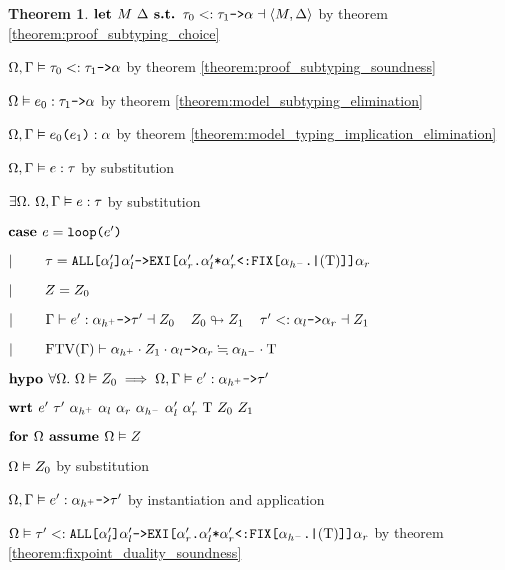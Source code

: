 \documentclass[acmsmall]{acmart}
\theoremstyle{definition}
\newtheorem{theorem}{Theorem}[section]
\begin{document}
\begin{theorem}
    \item \Z\Z $
      \B{let } M\ \Delta
      \B{ s.t. }
      \tau_0 \subtypes \code{$\tau_1$->$\alpha$} \given \left<M, \Delta \right>
    $ by theorem \ref{theorem:proof_subtyping_choice} 
    \item \Z\Z $
      \Omega, \Gamma \vDash \tau_0 <: \texttt{$\tau_1$->$\alpha$} 
    $ by theorem \ref{theorem:proof_subtyping_soundness} 
    \item \Z\Z $
      \Omega \vDash e_0 : \texttt{$\tau_1$->$\alpha$} 
    $ by theorem \ref{theorem:model_subtyping_elimination} 
    \item \Z\Z $
      \Omega, \Gamma \vDash \texttt{$e_0$($e_1$)} : \alpha
    $ by theorem \ref{theorem:model_typing_implication_elimination} 
    \item \Z\Z $
      \Omega, \Gamma \vDash e : \tau
    $ by substitution 
    \item \Z\Z $
      \exists \Omega .\ \Omega, \Gamma \vDash e : \tau
    $ by substitution 

  \item \Z $\textbf{case } 
    e = \texttt{loop($e'$)} 
  $ 
  \item \Z $|\ \ \ \ \ \ \   
    \tau = \texttt{ALL[$\alpha_l'$]$\alpha_l'$->EXI[$\alpha_r'$.$\alpha_l'$*$\alpha_r'$<:FIX[$\alpha_{h^-}$.|$(\mathrm{T})$]]$\alpha_r$} 
  $
  \item \Z $|\ \ \ \ \ \ \  
    Z = Z_0 
  $
  \item \Z $|\ \ \ \ \ \ \   
    \Gamma \vdash e' : \texttt{$\alpha_{h^+}$->$\tau'$} \dashv Z_0
    \hspace{4mm}
    Z_0 \looparrowright Z_1
    \hspace{4mm}
    \tau' <: \texttt{$\alpha_l$->$\alpha_r$} \dashv Z_1
  $ 
  \item \Z $|\ \ \ \ \ \ \   
    \text{FTV}(\Gamma) \vdash \alpha_{h^+} \cdot Z_1 \cdot \texttt{$\alpha_l$->$\alpha_r$} \fallingdotseq \alpha_{h^-} \cdot \mathrm{T}
  $
  \item \Z $\textbf{hypo } 
    \forall \Omega .\ \Omega \vDash Z_0 \implies
    \Omega, \Gamma \vDash e' : \texttt{$\alpha_{h^+}$->$\tau'$}
  $ 
  \item \Z $\B{wrt } e'\ \tau'\ \alpha_{h^+}\ \alpha_l\ \alpha_r\ \alpha_{h^-}\ \alpha_l'\ \alpha_r'\ \Tau\ Z_0\ Z_1 $ 
    \item \Z\Z $\textbf{for } \Omega \textbf{ assume } \Omega \vDash Z$
      \item \Z\Z\Z $\Omega \vDash Z_0$ by substitution
      \item \Z\Z\Z $
        \Omega, \Gamma \vDash e' : \texttt{$\alpha_{h^+}$->$\tau'$}
      $ by instantiation and application
      \item \Z\Z\Z $
        \Omega \vDash \tau' <: 
        \texttt{ALL[$\alpha_l'$]$\alpha_l'$->EXI[$\alpha_r'$.$\alpha_l'$*$\alpha_r'$<:FIX[$\alpha_{h^-}$.|$(\mathrm{T})$]]$\alpha_r$}
      $ by theorem \ref{theorem:fixpoint_duality_soundness}


\end{theorem}
\end{document}
